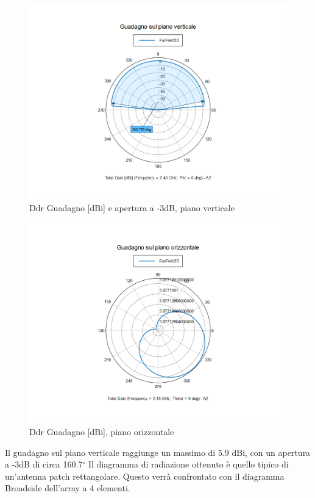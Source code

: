 \documentclass[twoside,twocolumn]{article}
\begin{document}
\begin{figure}[h!]
  \includegraphics[width=\linewidth]{A1_verticale.png}
  \caption{Ddr Guadagno [dBi] e apertura a -3dB, piano verticale}
  \label{fig:A1_verticale}
\end{figure}
\begin{figure}[h!]
  \includegraphics[width=\linewidth]{A1_orizzontale.png}
  \caption{Ddr Guadagno [dBi], piano orizzontale}
  \label{fig:A1_orizzontale}
\end{figure}


Il guadagno sul piano verticale raggiunge un massimo di 5.9 dBi, con un apertura a -3dB di circa 160.7$^\circ$
Il diagramma di radiazione ottenuto è quello tipico di un'antenna patch rettangolare.
Questo verrà confrontato con il diagramma Broadside dell'array a 4 elementi.
\end{document}
